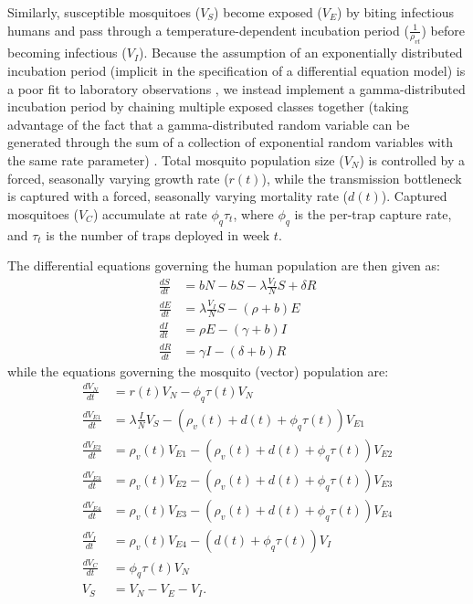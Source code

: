 \documentclass[10pt,letterpaper]{article}
\begin{document}
Similarly, susceptible mosquitoes ($V_S$) become exposed ($V_E$) by biting infectious humans and pass through a temperature-dependent incubation period ($\frac{1}{\rho_{vt}}$) before becoming infectious ($V_I$).
Because the assumption of an exponentially distributed incubation period (implicit in the specification of a differential equation model) is a poor fit to laboratory observations \cite{Chan2012}, we instead implement a gamma-distributed incubation period by chaining multiple exposed classes together (taking advantage of the fact that a gamma-distributed random variable can be generated through the sum of a collection of exponential random variables with the same rate parameter) \cite{Lloyd2001}.
Total mosquito population size ($V_N$) is controlled by a forced, seasonally varying growth rate ($r(t)$), while the transmission bottleneck is captured with a forced, seasonally varying mortality rate ($d(t)$).
Captured mosquitoes ($V_C$) accumulate at rate $\phi_q \tau_t$, where $\phi_q$ is the per-trap capture rate, and $\tau_t$ is the number of traps deployed in week $t$.

The differential equations governing the human population are then given as:
\begin{align} 
\frac{dS}{dt} &= bN - bS - \lambda \frac{V_{I}}{N} S + \delta R\\
\frac{dE}{dt} &= \lambda \frac{V_{I}}{N} S - (\rho + b)E\\
\frac{dI}{dt} &= \rho E - (\gamma + b)I\\
\frac{dR}{dt} &= \gamma I - (\delta + b)R
\end{align}
while the equations governing the mosquito (vector) population are:
\begin{align}
\frac{dV_N}{dt} & = r(t) V_N - \phi_q \tau(t) V_N \\
\frac{dV_{E1}}{dt} &= \lambda \frac{I}{N} V_S - (\rho_{v}(t) + d(t) + \phi_q \tau(t))V_{E1}\\
\frac{dV_{E2}}{dt} &= \rho_{v}(t) V_{E1} - (\rho_{v}(t) + d(t) + \phi_q \tau(t))V_{E2}\\
\frac{dV_{E3}}{dt} &= \rho_{v}(t) V_{E2}  - (\rho_{v}(t) + d(t) + \phi_q \tau(t))V_{E3}\\
\frac{dV_{E4}}{dt} &= \rho_{v}(t) V_{E3}  - (\rho_{v}(t) + d(t) + \phi_q \tau(t))V_{E4}\\
\frac{dV_I}{dt} &= \rho_{v}(t) V_{E4} - (d(t) + \phi_q \tau(t)) V_I\\
\frac{dV_C}{dt} & = \phi_q \tau(t) V_N\\
V_S &= V_N - V_E - V_I.
\end{align}
\end{document}
